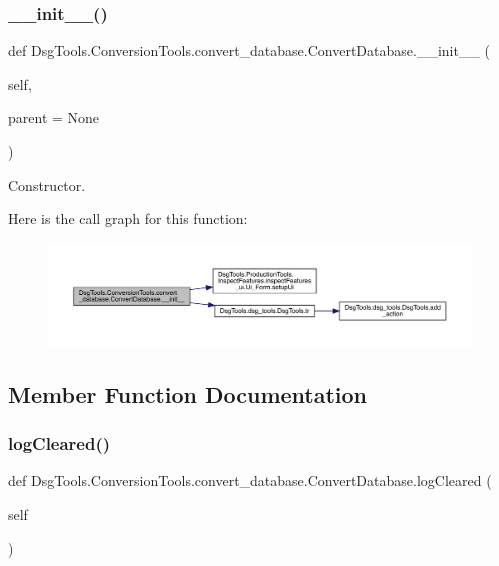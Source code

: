 \subsubsection{\texorpdfstring{\+\_\+\+\_\+init\+\_\+\+\_\+()}{\_\_init\_\_()}}
{\footnotesize\ttfamily def Dsg\+Tools.\+Conversion\+Tools.\+convert\+\_\+database.\+Convert\+Database.\+\_\+\+\_\+init\+\_\+\+\_\+ (\begin{DoxyParamCaption}\item[{}]{self,  }\item[{}]{parent = {\ttfamily None} }\end{DoxyParamCaption})}

\begin{DoxyVerb}Constructor.\end{DoxyVerb}
 Here is the call graph for this function\+:
\nopagebreak
\begin{figure}[H]
\begin{center}
\leavevmode
\includegraphics[width=350pt]{class_dsg_tools_1_1_conversion_tools_1_1convert__database_1_1_convert_database_a2ae9c370848e6747a2c5a0df798e4006_cgraph}
\end{center}
\end{figure}


\subsection{Member Function Documentation}
\mbox{\label{class_dsg_tools_1_1_conversion_tools_1_1convert__database_1_1_convert_database_a1fdc07691550f2c4fc363b60ab454c0b}} 
\subsubsection{\texorpdfstring{log\+Cleared()}{logCleared()}}
{\footnotesize\ttfamily def Dsg\+Tools.\+Conversion\+Tools.\+convert\+\_\+database.\+Convert\+Database.\+log\+Cleared (\begin{DoxyParamCaption}\item[{}]{self }\end{DoxyParamCaption})}

